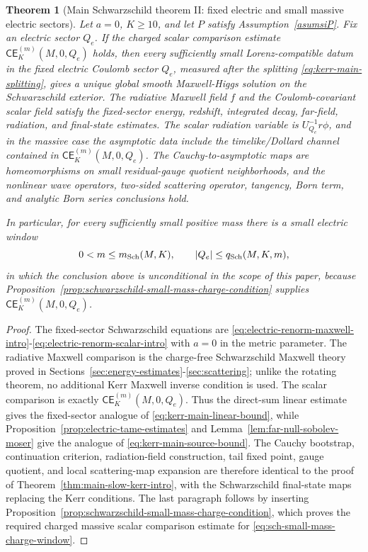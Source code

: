 \documentclass[11pt]{article}
\numberwithin{equation}{section}
\theoremstyle{plain}
\newtheorem{theorem}{Theorem}[section]
\theoremstyle{definition}
\theoremstyle{remark}
\newcommand{\CElec}{\mathsf{CE}}
\begin{document}
\begin{theorem}[Main Schwarzschild theorem II: fixed electric and small massive electric sectors]\label{thm:main-schwarzschild-electric-intro}
Let \(a=0\), \(K\ge10\), and let \(P\) satisfy Assumption~\ref{asumsiP}.  Fix an electric sector \(Q_e\).  If the charged scalar comparison estimate \(\CElec_K^{(m)}(M,0,Q_e)\) holds, then every sufficiently small Lorenz-compatible datum in the fixed electric Coulomb sector \(Q_e\), measured after the splitting \eqref{eq:kerr-main-splitting}, gives a unique global smooth Maxwell-Higgs solution on the Schwarzschild exterior.  The radiative Maxwell field \(f\) and the Coulomb-covariant scalar field satisfy the fixed-sector energy, redshift, integrated decay, far-field, radiation, and final-state estimates.  The scalar radiation variable is \(U_{Q_e}^{-1}r\phi\), and in the massive case the asymptotic data include the timelike/Dollard channel contained in \(\CElec_K^{(m)}(M,0,Q_e)\).  The Cauchy-to-asymptotic maps are homeomorphisms on small residual-gauge quotient neighborhoods, and the nonlinear wave operators, two-sided scattering operator, tangency, Born term, and analytic Born series conclusions hold.

In particular, for every sufficiently small positive mass there is a small electric window
\begin{equation}\label{eq:sch-small-mass-charge-window}
 0<m\le m_{\rm Sch}(M,K),
 \qquad
 |Q_e|\le q_{\rm Sch}(M,K,m),
\end{equation}
in which the conclusion above is unconditional in the scope of this paper, because Proposition~\ref{prop:schwarzschild-small-mass-charge-condition} supplies \(\CElec_K^{(m)}(M,0,Q_e)\).
\end{theorem}

\begin{proof}
The fixed-sector Schwarzschild equations are \eqref{eq:electric-renorm-maxwell-intro}-\eqref{eq:electric-renorm-scalar-intro} with \(a=0\) in the metric parameter.  The radiative Maxwell comparison is the charge-free Schwarzschild Maxwell theory proved in Sections~\ref{sec:energy-estimates}-\ref{sec:scattering}; unlike the rotating theorem, no additional Kerr Maxwell inverse condition is used.  The scalar comparison is exactly \(\CElec_K^{(m)}(M,0,Q_e)\).  Thus the direct-sum linear estimate gives the fixed-sector analogue of \eqref{eq:kerr-main-linear-bound}, while Proposition~\ref{prop:electric-tame-estimates} and Lemma~\ref{lem:far-null-sobolev-moser} give the analogue of \eqref{eq:kerr-main-source-bound}.  The Cauchy bootstrap, continuation criterion, radiation-field construction, tail fixed point, gauge quotient, and local scattering-map expansion are therefore identical to the proof of Theorem~\ref{thm:main-slow-kerr-intro}, with the Schwarzschild final-state maps replacing the Kerr conditions.  The last paragraph follows by inserting Proposition~\ref{prop:schwarzschild-small-mass-charge-condition}, which proves the required charged massive scalar comparison estimate for \eqref{eq:sch-small-mass-charge-window}.
\end{proof}
\end{document}
